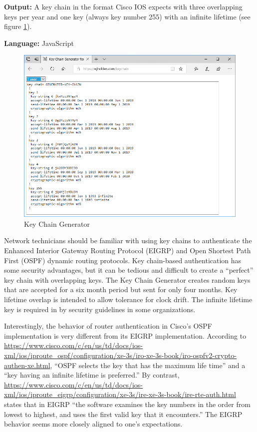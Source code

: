 \documentclass[12pt]{article}
\begin{document}
\noindent \textbf{Output:} A key chain in the format Cisco IOS expects with three overlapping keys per year and one key (always key number 255) with an infinite lifetime (see figure \ref{fig:keychain}).

\noindent \textbf{Language:} JavaScript

\begin{figure}[h]
\centering
\includegraphics[width=.80\textwidth]{Key-Chain}
\caption{Key Chain Generator}
\label{fig:keychain}
\end{figure}

Network technicians should be familiar with using key chains to authenticate the Enhanced Interior Gateway Routing Protocol (EIGRP) and Open Shortest Path First (OSPF) dynamic routing protocols.
Key chain-based authentication has some security advantages, but it can be tedious and difficult to create a ``perfect'' key chain with overlapping keys.
The Key Chain Generator creates random keys that are accepted for a six month period but sent for only four months.
Key lifetime overlap is intended to allow tolerance for clock drift. The infinite lifetime key is required in by security guidelines in some organizations.

Interestingly, the behavior of router authentication in Cisco's OSPF implementation is very different from its EIGRP implementation.
According to \url{https://www.cisco.com/c/en/us/td/docs/ios-xml/ios/iproute_ospf/configuration/xe-3s/iro-xe-3s-book/iro-ospfv2-crypto-authen-xe.html}, ``OSPF selects the key that has the maximum life time'' and a ``key having an infinite lifetime is preferred.''
By contrast, \url{https://www.cisco.com/c/en/us/td/docs/ios-xml/ios/iproute_eigrp/configuration/xe-3s/ire-xe-3s-book/ire-rte-auth.html} states that in EIGRP ``the software examines the key numbers in the order from lowest to highest, and uses the first valid key that it encounters.''
The EIGRP behavior seems more closely aligned to one's expectations.
\end{document}
